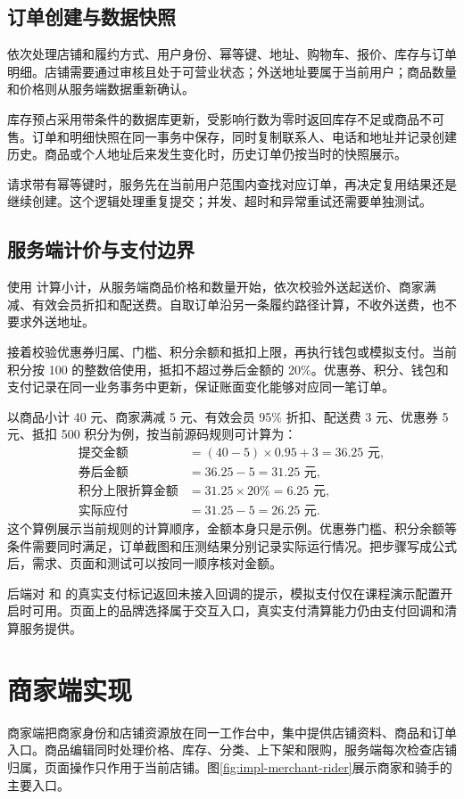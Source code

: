 \subsection{订单创建与数据快照}
 依次处理店铺和履约方式、用户身份、幂等键、地址、购物车、报价、库存与订单明细。店铺需要通过审核且处于可营业状态；外送地址要属于当前用户；商品数量和价格则从服务端数据重新确认。

库存预占采用带条件的数据库更新，受影响行数为零时返回库存不足或商品不可售。订单和明细快照在同一事务中保存，同时复制联系人、电话和地址并记录创建历史。商品或个人地址后来发生变化时，历史订单仍按当时的快照展示。

请求带有幂等键时，服务先在当前用户范围内查找对应订单，再决定复用结果还是继续创建。这个逻辑处理重复提交；并发、超时和异常重试还需要单独测试。
\subsection{服务端计价与支付边界}
 使用  计算小计，从服务端商品价格和数量开始，依次校验外送起送价、商家满减、有效会员折扣和配送费。自取订单沿另一条履约路径计算，不收外送费，也不要求外送地址。

 接着校验优惠券归属、门槛、积分余额和抵扣上限，再执行钱包或模拟支付。当前积分按 100 的整数倍使用，抵扣不超过券后金额的 20\%。优惠券、积分、钱包和支付记录在同一业务事务中更新，保证账面变化能够对应同一笔订单。

以商品小计 40 元、商家满减 5 元、有效会员 95\% 折扣、配送费 3 元、优惠券 5 元、抵扣 500 积分为例，按当前源码规则可计算为：
\begin{align*}
\text{提交金额}&=(40-5)\times0.95+3=36.25\text{ 元},\\
\text{券后金额}&=36.25-5=31.25\text{ 元},\\
\text{积分上限折算金额}&=31.25\times20\%=6.25\text{ 元},\\
\text{实际应付}&=31.25-5=26.25\text{ 元}.
\end{align*}
这个算例展示当前规则的计算顺序，金额本身只是示例。优惠券门槛、积分余额等条件需要同时满足，订单截图和压测结果分别记录实际运行情况。把步骤写成公式后，需求、页面和测试可以按同一顺序核对金额。

后端对  和  的真实支付标记返回未接入回调的提示，模拟支付仅在课程演示配置开启时可用。页面上的品牌选择属于交互入口，真实支付清算能力仍由支付回调和清算服务提供。
\section{商家端实现}
商家端把商家身份和店铺资源放在同一工作台中，集中提供店铺资料、商品和订单入口。商品编辑同时处理价格、库存、分类、上下架和限购，服务端每次检查店铺归属，页面操作只作用于当前店铺。图\ref{fig:impl-merchant-rider}展示商家和骑手的主要入口。

